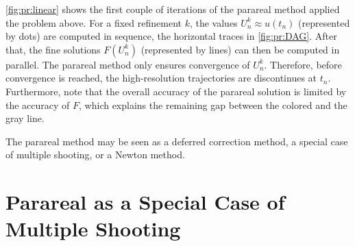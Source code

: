 \begin{example}
  \autoref{fig:pr:linear} shows the first couple of iterations of the parareal method applied the problem above.
  For a fixed refinement $k$,
  the values $U^k_n \approx u(t_n)$ (represented by dots) are computed in sequence,
  \cf the horizontal traces in \autoref{fig:pr:DAG}.
  After that, the fine solutions $F(U_n^k)$ (represented by lines) can then be computed in parallel.
  The parareal method only ensures convergence of $U_n^k$.
  Therefore, before convergence is reached,
  the high-resolution trajectories are discontinues at $t_n$.
  Furthermore, note that the overall accuracy of the parareal solution is limited by the accuracy of $F$,
  which explains the remaining gap between the colored and the gray line.
\end{example}

The parareal method may be seen \eg as a deferred correction method,
a special case of multiple shooting, or a Newton method.

\section{Parareal as a Special Case of Multiple Shooting}
\label{sec:pr:newton}

